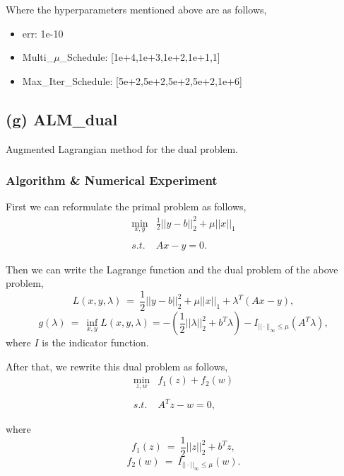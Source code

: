 \documentclass[]{article}
\begin{document}
Where the hyperparameters mentioned above are as follows,

\begin{itemize}
	\item err: 1e-10
	\item Multi\_$\mu$\_Schedule: [1e+4,1e+3,1e+2,1e+1,1]
	\item Max\_Iter\_Schedule: [5e+2,5e+2,5e+2,5e+2,1e+6]
\end{itemize}


\subsection{(g) ALM\_dual}
\noindent
Augmented Lagrangian method for the dual problem.

\subsubsection{Algorithm \& Numerical Experiment}

First we can reformulate the primal problem as follows,
\begin{equation}
\begin{array}{ll}
\min_{x,y} & \frac{1}{2} ||y-b||_2^2+\mu||x||_1 \\
&\\
{s.t.} &  Ax-y=0.
\end{array}
\end{equation}

Then we can write the Lagrange function and the dual problem of the above problem,
\begin{equation}
	L(x,y,\lambda) \ = \ \frac{1}{2}||y-b||_2^2+\mu||x||_1+\lambda^T(Ax-y),
\end{equation}
\begin{equation}
	g(\lambda) \ =\ \inf_{x,y}L(x,y,\lambda)=-(\frac{1}{2}||\lambda||_2^2+b^T\lambda) -I_{||\cdot||_{\infty}\leq \mu}(A^T\lambda),
\end{equation}
where $I$ is the indicator function.

After that, we rewrite this dual problem as follows,
\begin{equation}\label{dual}
\begin{array}{ll}
\min_{z,w} & f_1(z)+f_2(w) \\
&\\
{s.t.} &  A^Tz-w=0,
\end{array}
\end{equation}

where
\begin{equation}
	f_1(z) \ = \ \frac{1}{2}||z||_2^2+b^Tz,
\end{equation}
\begin{equation}
	f_2(w)\ = \ I_{||\cdot||_{\infty}\leq \mu}(w).
\end{equation}
\end{document}

